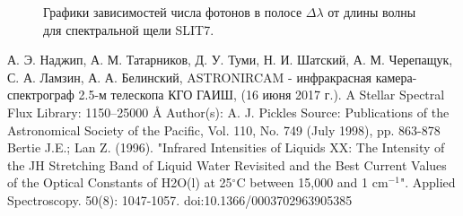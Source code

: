 \documentclass[a4paper]{article}
\begin{document}
\begin{figure}[h]
\begin{minipage}[h]{0.5\linewidth}
\end{minipage}
\begin{minipage}[h]{0.5\linewidth}
\end{minipage}
\begin{minipage}[h]{0.5\linewidth}
\end{minipage}
\caption{Графики зависимостей числа фотонов в полосе $\Delta\lambda$ от длины волны для спектральной щели SLIT7.}
\end{figure}
\clearpage

\hfill\break

\begin{thebibliography}{3}
А. Э. Наджип, А. М. Татарников, Д. У. Туми, Н. И. Шатский, А. М. Черепащук, С. А. Ламзин, А. А. Белинский,  ASTRONIRCAM - инфракрасная камера-спектрограф 2.5-м телескопа КГО ГАИШ, (16 июня 2017 г.).
A Stellar Spectral Flux Library: 1150–25000 Å
Author(s): A. J.  Pickles
Source: 
Publications of the Astronomical Society of the Pacific, 
Vol. 110, No. 749 (July 1998),
pp. 863-878
Bertie J.E.; Lan Z. (1996). "Infrared Intensities of Liquids XX: The Intensity of the JH Stretching Band of Liquid Water Revisited and the Best Current Values of the Optical Constants of H2O(l) at 25$^\circ$C between 15,000 and 1 cm$^{-1}$". Applied Spectroscopy. 50(8): 1047-1057.
doi:10.1366/0003702963905385
\end{thebibliography}
\end{document}

